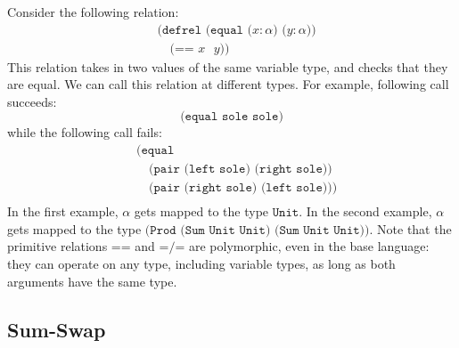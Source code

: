 \documentclass{report}
\theoremstyle{definition}
\begin{document}
Consider the following relation:
\begin{equation}
\begin{aligned}
	& \texttt{(defrel (equal (\(x : \alpha\)) (\(y : \alpha\)))} \\
	& \quad \texttt{(== \(x\) \(y\)))}
\end{aligned}
\end{equation}
This relation takes in two values of the same variable type, and checks that they are equal.
We can call this relation at different types.
For example, following call succeeds:
\begin{equation}
	\texttt{(equal sole sole)} 
\end{equation}
while the following call fails:
\begin{equation}
\begin{aligned}
	& \texttt{(equal}\\
	& \quad \texttt{(pair (left sole) (right sole))} \\
	& \quad \texttt{(pair (right sole) (left sole)))} \\
\end{aligned}
\end{equation}
In the first example, \(\alpha\) gets mapped to the type \(\texttt{Unit}\).
In the second example, \(\alpha\) gets mapped to the type \(\texttt{(Prod (Sum Unit Unit) (Sum Unit Unit))}\).
Note that the primitive relations \(\texttt{==}\) and \(\texttt{=/=}\) are polymorphic, even in the base language:
they can operate on any type, including variable types, as long as both arguments have the same type.

\subsection{Sum-Swap}
\end{document}
